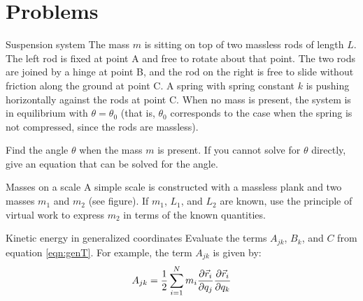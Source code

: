 \section{Problems}
\begin{problem}{Suspension system}
The mass $m$ is sitting on top of two massless rods of length $L$. The left rod is fixed at point A and free to rotate about that point. The two rods are joined by a hinge at point B, and the rod on the right is free to slide without friction along the ground at point C. A spring with spring constant $k$ is pushing horizontally against the rods at point C. When no mass is present, the system is in equilibrium with $\theta= \theta_0$ (that is, $\theta_0$ corresponds to the case when the spring is not compressed, since the rods are massless).

Find the angle $\theta$ when the mass $m$ is present. If you cannot solve for $\theta$ directly, give an equation that can be solved for the angle.
\\
\label{prob_VirtWork_1}
\end{problem}

\begin{problem}{Masses on a scale}
A simple scale is constructed with a massless plank and two masses $m_1$ and $m_2$ (see figure). If $m_1$, $L_1$, and $L_2$ are known, use the principle of virtual work to express $m_2$ in terms of the known quantities.
\\
\label{prob_VirtWork_2}
\end{problem}

\begin{problem}{Kinetic energy in generalized coordinates} Evaluate the terms $A_{jk}$, $B_{k}$, and $C$ from equation \ref{eqn:genT}. For example, the term $A_{jk}$ is given by:
\begin{align*}
A_{jk}=\frac{1}{2}\sum_{i=1}^Nm_i\frac{\partial \vec r_i}{\partial q_j}\frac{\partial \vec r_i}{\partial q_k}
\end{align*}
\label{prob_VirtWork_3}
\end{problem}

